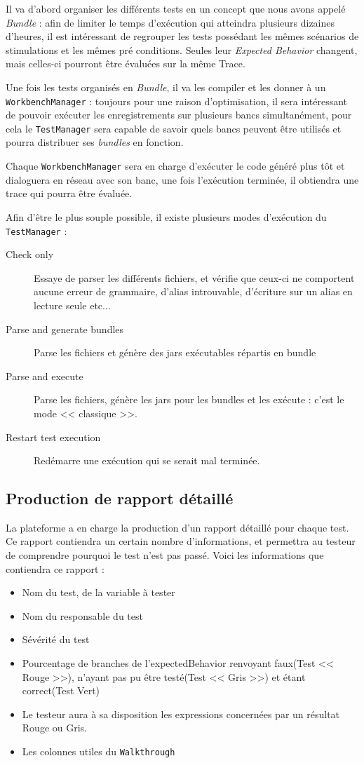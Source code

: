 	Il va d'abord organiser les différents tests en un concept que nous avons appelé \textit{Bundle} : afin de limiter le temps d'exécution qui atteindra plusieurs dizaines d'heures, il est intéressant de regrouper les tests possédant les mêmes scénarios de stimulations et les mêmes pré conditions. Seules leur \textit{Expected Behavior} changent, mais celles-ci pourront être évaluées sur la même Trace.

	Une fois les tests organisés en \textit{Bundle}, il va les compiler et les donner à un \texttt{WorkbenchManager} : toujours pour une
	raison d'optimisation, il sera intéressant de pouvoir exécuter les enregistrements sur plusieurs bancs simultanément, pour cela le
	\texttt{TestManager} sera capable de savoir quels bancs peuvent être utilisés et pourra distribuer ses \textit{bundles} en fonction. 

	Chaque \texttt{WorkbenchManager} sera en charge d'exécuter le code généré plus tôt et dialoguera en réseau avec son banc, une fois l'exécution terminée, il obtiendra une trace qui pourra être évaluée.

	Afin d'être le plus souple possible, il existe plusieurs modes d'exécution du \texttt{TestManager} : 
	\begin{description}
		\item[Check only] Essaye de parser les différents fichiers, et vérifie que ceux-ci ne comportent aucune erreur de grammaire, d'alias introuvable, d'écriture sur un alias en lecture seule etc...
		\item[Parse and generate bundles] Parse les fichiers et génère des jars exécutables répartis en bundle
		\item[Parse and execute] Parse les fichiers, génère les jars pour les bundles et les exécute : c'est le mode << classique >>.
		\item[Restart test execution] Redémarre une exécution qui se serait mal terminée.
	\end{description}

	\subsection{Production de rapport détaillé}\label{report}
	La plateforme a en charge la production d'un rapport détaillé pour chaque test. Ce rapport contiendra un certain nombre d'informations, et permettra au testeur de comprendre pourquoi le test n'est pas passé. Voici les informations que contiendra ce rapport : 

	\begin{itemize}
		\item Nom du test, de la variable à tester
		\item Nom du responsable du test
		\item Sévérité du test
		\item Pourcentage de branches de l'expectedBehavior renvoyant faux(Test << Rouge >>), n'ayant pas pu être testé(Test << Gris >>) et étant correct(Test Vert)
		\item Le testeur aura à sa disposition les expressions concernées par un résultat Rouge ou Gris.
		\item Les colonnes utiles du \texttt{Walkthrough}
	\end{itemize}

